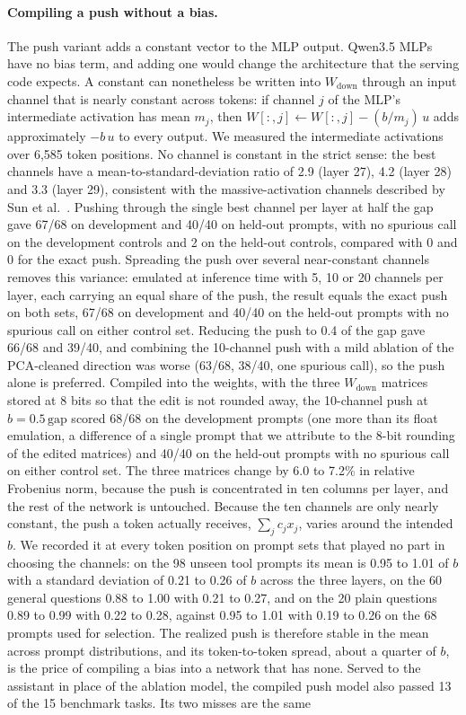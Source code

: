 \documentclass[11pt]{article}
\begin{document}
\paragraph{Compiling a push without a bias.} The push variant adds a constant vector to the MLP output. Qwen3.5 MLPs have no bias term, and adding one would change the architecture that the serving code expects. A constant can nonetheless be written into $W_{\text{down}}$ through an input channel that is nearly constant across tokens: if channel $j$ of the MLP's intermediate activation has mean $m_j$, then $W[:,j] \leftarrow W[:,j] - (b/m_j)\,u$ adds approximately $-b\,u$ to every output. We measured the intermediate activations over 6,585 token positions. No channel is constant in the strict sense: the best channels have a mean-to-standard-deviation ratio of 2.9 (layer 27), 4.2 (layer 28) and 3.3 (layer 29), consistent with the massive-activation channels described by Sun et al.~\citep{sun2024massive}. Pushing through the single best channel per layer at half the gap gave 67/68 on development and 40/40 on held-out prompts, with no spurious call on the development controls and 2 on the held-out controls, compared with 0 and 0 for the exact push. Spreading the push over several near-constant channels removes this variance: emulated at inference time with 5, 10 or 20 channels per layer, each carrying an equal share of the push, the result equals the exact push on both sets, 67/68 on development and 40/40 on the held-out prompts with no spurious call on either control set. Reducing the push to 0.4 of the gap gave 66/68 and 39/40, and combining the 10-channel push with a mild ablation of the PCA-cleaned direction was worse (63/68, 38/40, one spurious call), so the push alone is preferred. Compiled into the weights, with the three $W_{\text{down}}$ matrices stored at 8 bits so that the edit is not rounded away, the 10-channel push at $b = 0.5\,\mathrm{gap}$ scored 68/68 on the development prompts (one more than its float emulation, a difference of a single prompt that we attribute to the 8-bit rounding of the edited matrices) and 40/40 on the held-out prompts with no spurious call on either control set. The three matrices change by 6.0 to 7.2\% in relative Frobenius norm, because the push is concentrated in ten columns per layer, and the rest of the network is untouched. Because the ten channels are only nearly constant, the push a token actually receives, $\sum_j c_j x_j$, varies around the intended $b$. We recorded it at every token position on prompt sets that played no part in choosing the channels: on the 98 unseen tool prompts its mean is 0.95 to 1.01 of $b$ with a standard deviation of 0.21 to 0.26 of $b$ across the three layers, on the 60 general questions 0.88 to 1.00 with 0.21 to 0.27, and on the 20 plain questions 0.89 to 0.99 with 0.22 to 0.28, against 0.95 to 1.01 with 0.19 to 0.26 on the 68 prompts used for selection. The realized push is therefore stable in the mean across prompt distributions, and its token-to-token spread, about a quarter of $b$, is the price of compiling a bias into a network that has none. Served to the assistant in place of the ablation model, the compiled push model also passed 13 of the 15 benchmark tasks. Its two misses are the same 
\end{document}
